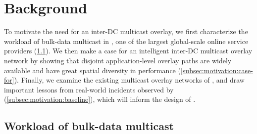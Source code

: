 \section{Background}
\label{sec:motivation}


To motivate the need for an inter-DC multicast overlay,
we first characterize the workload of bulk-data multicast in
\company, one of the largest global-scale online service
providers (\Section\ref{subsec:motivation:multicast-traffic}).
We then make a case for an intelligent inter-DC multicast
overlay network by showing that disjoint application-level
overlay paths are widely available and have great spatial
diversity in performance
(\Section\ref{subsec:motivation:case-for}).
Finally, we examine the existing multicast overlay networks
of \company, and draw important lessons from real-world incidents
observed by \company (\Section\ref{subsec:motivation:baseline}),
which will inform the design of \name.


\subsection{Workload of bulk-data multicast}
\label{subsec:motivation:multicast-traffic}

